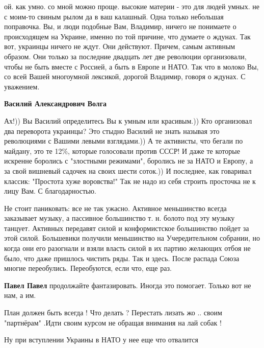 \begin{itemize}
\begin{itemize}
ой. как умно. со мной можно проще. высокие материи - это для людей умных. не с
моим-то свиным рылом да в ваш калашный. Одна только небольшая поправочка. Вы, и
люди подобные Вам, Владимир, ничего не понимаете о происходящем на Украине,
именно по той причине, что думаете о ждунах. Так вот, украинцы ничего не ждут.
Они действуют. Причем, самым активным образом. Они только за последние двадцать
лет две революции организовали, чтобы не быть вместе с Россией, а быть в Европе
и НАТО. Так что в молоко Вы, со всей Вашей многоумной лексикой, дорогой
Владимир, говоря о ждунах. С уважением.

\textbf{Василий Александрович Волга} 

Ах!)) Вы Василий определитесь Вы к умным или красивым.)) Кто организовал два
переворота украинцы? Это стыдно Василий не знать называя это революциями с
Вашими левыми взглядами.)) А те активисты, что бегали по майдану, это те 12\%,
которые голосовали против СССР! И даже те которые искренне боролись с
"злостными режимами", боролись не за НАТО и Европу, а за свой вишневый садочек
на своих шести соток.)) И последнее, как говаривал классик: "Простота хуже
воровства!" Так не надо из себя строить просточка не к лицу Вам. С
благодарностью.

\end{itemize} %


Не стоит паниковать: все не так ужасно. Активное меньшинство всегда заказывает
музыку, а пассивное большинство т. н. болото под эту музыку танцует. Активных
передавят силой и конформистское большинство пойдет за этой силой. Большевики
получили меньшинство на Учередительном собрании, но когда они его разогнали и
взяли власть силой в их партию желающих отбоя не было, что даже пришлось
чистить ряды. Так и здесь. После распада Союза многие переобулись. Переобуются,
если что, еще раз.

\begin{itemize} %
\textbf{Павел Павел} продолжайте фантазировать. Иногда это помогает. Только вот не нам, а им.
\end{itemize} %

План должен быть всегда ! Что делать ? Перестать лизать жо .. своим "партнёрам" .Идти своим курсом не обращая внимания на лай собак !

Ну при вступлении Украины в НАТО у нее еще что отвалится


\end{itemize}
